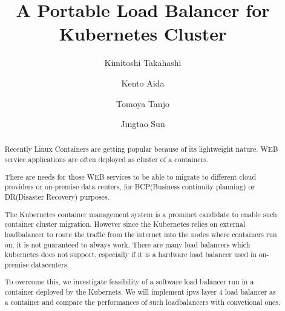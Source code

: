 \documentclass[sigconf]{acmart}
\begin{document}
\title{A Portable Load Balancer for Kubernetes Cluster}

\author{Kimitoshi Takahashi}

\author{Kento Aida}

\author{Tomoya Tanjo}

\author{Jingtao Sun}

\renewcommand{\shortauthors}{K. Takahashi et al.}


\begin{abstract}
Recently Linux Containers are getting popular because of its lightweight nature.
WEB service applications are often deployed as cluster of a containers.

There are needs for those WEB services to be able to migrate to different cloud providers
or on-premise data centers, for BCP(Business continuity planning) or DR(Disaster Recovery) purposes.

The Kubernetes container management system is a prominet candidate to enable such container cluster migration.
However since the Kubernetes relies on external loadbalancer to route the traffic from the internet into the nodes where containers run on, 
it is not guaranteed to always work.
There are many load balancers which kubernetes does not support, 
especially if it is a hardware load balancer used in on-premise datacenters.

To overcome this, we investigate feasibility of a software load balancer run in a container deployed by the Kubernets. 
We will implement ipvs layer 4 load balancer as a container and compare the performances of such loadbalancers with convetional ones.

\end{abstract}
\end{document}
